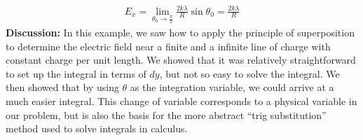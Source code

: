 \begin{example}
\begin{align*}
E_x=\lim_{\theta_0\to\frac{\pi}{2}}\frac{2k\lambda}{R}\sin\theta_0=\frac{2k\lambda}{R}
\end{align*}
\textbf{Discussion:} In this example, we saw how to apply the principle of superposition to determine the electric field near a finite and a infinite line of charge with constant charge per unit length. We showed that it was relatively straightforward to set up the integral in terms of $dy$, but not so easy to solve the integral. We then showed that by using $\theta$ as the integration variable, we could arrive at a much easier integral. This change of variable corresponds to a physical variable in our problem, but is also the basis for the more abstract ``trig substitution'' method used to solve integrals in calculus.
\end{example}
\newpage
